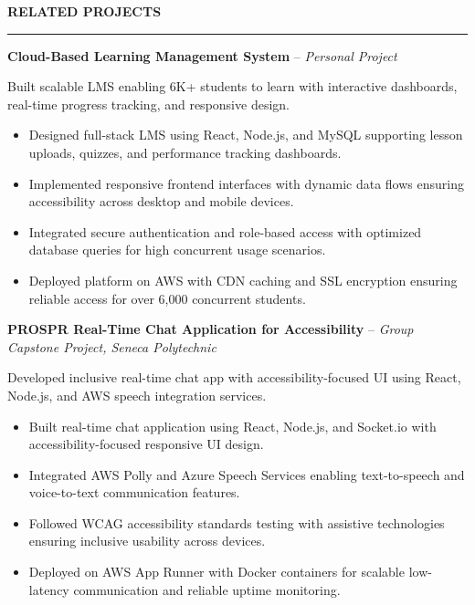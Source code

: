 \documentclass[10pt,letterpaper]{article}
\begin{document}
\vspace{6pt}

\textbf{RELATED PROJECTS}\\[-8pt]
\noindent\rule{\textwidth}{1pt}

\vspace{-2pt}

\textbf{Cloud-Based Learning Management System} -- \emph{Personal Project}

\vspace{-1pt}

Built scalable LMS enabling 6K+ students to learn with interactive dashboards, real-time progress tracking, and responsive design.
\vspace{-1pt}
\begin{itemize}
\item Designed full-stack LMS using React, Node.js, and MySQL supporting lesson uploads, quizzes, and performance tracking dashboards.
\item Implemented responsive frontend interfaces with dynamic data flows ensuring accessibility across desktop and mobile devices.
\item Integrated secure authentication and role-based access with optimized database queries for high concurrent usage scenarios.
\item Deployed platform on AWS with CDN caching and SSL encryption ensuring reliable access for over 6,000 concurrent students.
\end{itemize}

\textbf{PROSPR  Real-Time Chat Application for Accessibility} -- \emph{Group Capstone Project, Seneca Polytechnic}

\vspace{-1pt}

Developed inclusive real-time chat app with accessibility-focused UI using React, Node.js, and AWS speech integration services.
\vspace{-1pt}
\begin{itemize}
\item Built real-time chat application using React, Node.js, and Socket.io with accessibility-focused responsive UI design.
\item Integrated AWS Polly and Azure Speech Services enabling text-to-speech and voice-to-text communication features.
\item Followed WCAG accessibility standards testing with assistive technologies ensuring inclusive usability across devices.
\item Deployed on AWS App Runner with Docker containers for scalable low-latency communication and reliable uptime monitoring.
\end{itemize}
\end{document}
